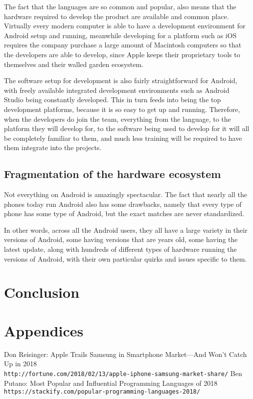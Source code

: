 \documentclass[12pt, letterpaper]{article}
\begin{document}
The fact that the languages are so common and popular, also means that the
hardware required to develop the product are available and common place.
Virtually every modern computer is able to have a development environment
for Android setup and running, meanwhile developing for a platform such as
iOS requires the company purchase a large amount of Macintosh computers
so that the developers are able to develop, since Apple keeps their
proprietary tools to themselves and their walled garden ecosystem.

The software setup for development is also fairly straightforward for
Android, with freely available integrated development environments such
as Android Studio being constantly developed. This in turn feeds into being
the top development platforms, because it is so easy to get up and running.
Therefore, when the developers do join the team, everything from the
language, to the platform they will develop for, to the software being used
to develop for it will all be completely familiar to them, and much less
training will be required to have them integrate into the projects.

\subsection{Fragmentation of the hardware ecosystem}
Not everything on Android is amazingly spectacular. The fact that nearly
all the phones today run Android also has some drawbacks, namely that
every type of phone has some type of Android, but the exact matches are
never standardized.

In other words, across all the Android users, they all have a large variety
in their versions of Android, some having versions that are years old,
some having the latest update, along with hundreds of different types of
hardware running the versions of Android, with their own particular quirks
and issues specific to them.



\section{Conclusion}

\section{Appendices}

\begin{thebibliography}{9}
Don Reisinger: Apple Trails Samsung in Smartphone Market—And Won't Catch Up in 2018
\\\texttt{http://fortune.com/2018/02/13/apple-iphone-samsung-market-share/}
Ben Putano: Most Popular and Influential Programming Languages of 2018
\\\texttt{https://stackify.com/popular-programming-languages-2018/}
\end{thebibliography}
\end{document}
